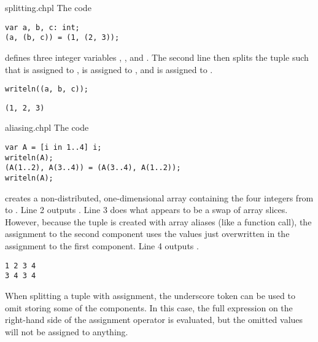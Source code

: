 \begin{chapelexample}{splitting.chpl}
The code
\begin{chapel}
\begin{verbatim}
var a, b, c: int;
(a, (b, c)) = (1, (2, 3));
\end{verbatim}
\end{chapel}
defines three integer variables , , and .  The
second line then splits the tuple  such that 
is assigned to ,  is assigned to ,
and  is assigned to .
\begin{chapelpost}
\begin{verbatim}
writeln((a, b, c));
\end{verbatim}
\end{chapelpost}
\begin{chapeloutput}
\begin{verbatim}
(1, 2, 3)
\end{verbatim}
\end{chapeloutput}
\end{chapelexample}

\begin{chapelexample}{aliasing.chpl}
The code
\begin{chapel}
\begin{verbatim}
var A = [i in 1..4] i;
writeln(A);
(A(1..2), A(3..4)) = (A(3..4), A(1..2));
writeln(A);
\end{verbatim}
\end{chapel}
creates a non-distributed, one-dimensional array containing the four
integers from  to .  Line 2 outputs .
Line 3 does what appears to be a swap of array slices.  However,
because the tuple is created with array aliases (like a function
call), the assignment to the second component uses the values just
overwritten in the assignment to the first component.  Line 4
outputs .
\begin{chapeloutput}
\begin{verbatim}
1 2 3 4
3 4 3 4
\end{verbatim}
\end{chapeloutput}
\end{chapelexample}

When splitting a tuple with assignment, the underscore token can
be used to omit storing some of the components.  In this case, the
full expression on the right-hand side of the assignment operator is
evaluated, but the omitted values will not be assigned to anything.

